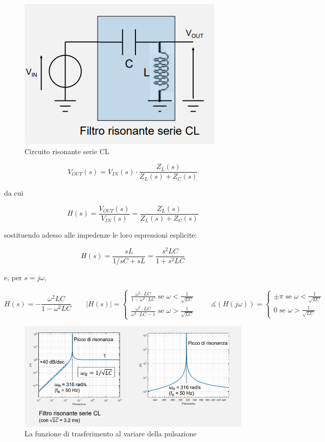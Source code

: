\documentclass{article}
\begin{document}
\begin{figure}[h]
  \centering
  \includegraphics[scale=0.5]{IM_circuito_risonante_serie_CL}
  \caption{Circuito risonante serie CL}
  \label{Schema_circuito_risonante_serie_CL}
\end{figure}

\[V_{OUT}(s) = V_{IN}(s) \cdot \frac{Z_L(s)}{Z_L(s) + Z_C(s)}\]

da cui

\[H(s) = \frac{V_{OUT} (s)}{V_{IN} (s)} = \frac{Z_L(s)}{Z_L(s) + Z_C(s)}\]

sostituendo adesso alle impedenze le loro espressioni esplicite:

\[H(s) = \frac{sL}{1/sC + sL} = \frac{s^2 LC}{1 + s^2 LC}\]

e, per $s = j\omega$, 

\[H(s) = -\frac{\omega ^2 LC}{1 - \omega ^2 LC} \quad \quad |H(s)| = \begin{cases} \frac{\omega ^2 \cdot LC}{1 - \omega ^2 \cdot LC} \textrm{ se } \omega < \frac{1}{\sqrt{LC}} \\ \frac{\omega ^2 \cdot LC}{\omega ^2 \cdot LC - 1} \textrm{ se } \omega > \frac{1}{\sqrt{LC}} \end{cases} \quad \quad \measuredangle (H(j \omega)) = \begin{cases} \pm \pi \textrm{ se } \omega < \frac{1}{\sqrt{LC}} \\ 0 \textrm{ se } \omega > \frac{1}{\sqrt{LC}} \end{cases}\]

\begin{figure}[h]
  \centering
  \includegraphics[scale=0.55]{IM_circuito_risonante_serie_CL_grafici}
  \caption{La funzione di trasferimento al variare della pulsazione}
  \label{Schema_circuito_risonante_serie_CL_grafici}
\end{figure}
\end{document}
